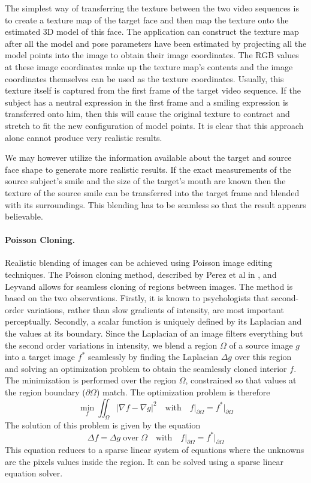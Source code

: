 \documentclass[11pt,a4paper]{report}
\begin{document}
The simplest way of transferring the texture between the two
video sequences is to create a texture map of the target face and then map
the texture onto the estimated 3D model of this face. The application can
construct the texture map after all the model and pose parameters have been
estimated by projecting all the model points into the image to obtain their
image coordinates. The RGB values at these image coordinates make up the texture
map's contents and the image coordinates themselves can be used as the texture
coordinates. Usually, this texture itself is captured from the first frame of the
target video sequence. If the subject has a neutral expression in the first frame and a smiling expression is
transferred onto him, then this will cause the original texture to contract and
stretch to fit the new configuration of model points. It is clear that this
approach alone cannot produce very realistic results. 

We may however utilize the information available about the target and source
face shape to generate more realistic results. If the exact measurements of the
source subject's smile and the size of the target's mouth are known then the texture
of the source smile can be transferred into the target frame and blended with its
surroundings. This blending has to be seamless so that the result appears believable. 

\paragraph{Poisson Cloning.} Realistic blending of images can be achieved using
Poisson image editing techniques. The Poisson cloning method, described by Perez
et al in \cite{perez}, and Leyvand \cite{poisson} allows for seamless cloning of
regions between images.
The method is based on the two observations. Firstly, it is known to
psychologists \cite{perez} that second-order variations, rather than
slow gradients of intensity, are most important perceptually. Secondly, a scalar
function is uniquely defined by its Laplacian and the values at its
boundary. Since the Laplacian of an image filters everything but the second
order variations in intensity, we blend a region $\Omega$ of a source image $g$ into a
target image $f^*$ seamlessly
by finding the Laplacian $\Delta g$ over this region and solving an optimization
problem to obtain the seamlessly cloned interior $f$. The minimization is
performed over the region $\Omega$, constrained so that values at the region boundary
($\partial \Omega$) match. The optimization problem is therefore 
\begin{equation}
\mathop{min}_f \iint_{\Omega} \vert \nabla f  - \nabla g \vert^2 \quad \mathrm{with} \quad
f\vert_{\partial \Omega} = f^*\vert_{\partial \Omega}
\end{equation}
The solution of this problem is given by the equation
\begin{equation}
\Delta f = \Delta g \; \mathrm{over} \; \Omega \quad \mathrm{with} \quad
f\vert_{\partial \Omega} = f^*\vert_{\partial \Omega}
\end{equation}
This equation reduces to a sparse linear system of equations where the unknowns are the
pixels values inside the region. It can be solved using a sparse linear equation
solver.
\end{document}
